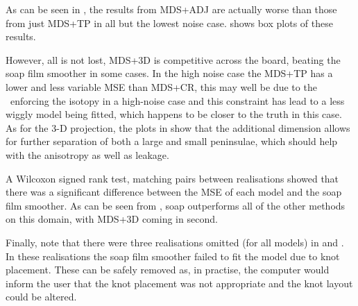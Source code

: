 As can be seen in , the results from MDS+ADJ are actually worse than those from just MDS+TP in all but the lowest noise case.  shows box plots of these results.

However, all is not lost, MDS+3D is competitive across the board, beating the soap film smoother in some cases. In the high noise case the MDS+TP has a lower and less variable MSE than MDS+CR, this may well be due to the \tprs\ enforcing the isotopy in a high-noise case and this constraint has lead to a less wiggly model being fitted, which happens to be closer to the truth in this case. As for the 3-D projection, the plots in  show that the additional dimension allows for further separation of both a large and small peninsulae, which should help with the anisotropy as well as leakage.

A Wilcoxon signed rank test, matching pairs between realisations showed that there was a significant difference between the MSE of each model and the soap film smoother. As can be seen from , soap outperforms all of the other methods on this domain, with MDS+3D coming in second. 

Finally, note that there were three realisations omitted (for all models) in  and . In these realisations the soap film smoother failed to fit the model due to knot placement. These can be safely removed as, in practise, the computer would inform the user that the knot placement was not appropriate and the knot layout could be altered.

